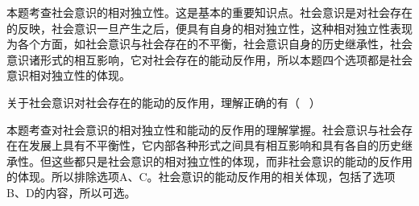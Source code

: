 \begin{solution}本题考查社会意识的相对独立性。这是基本的重要知识点。社会意识是对社会存在的反映，社会意识一旦产生之后，便具有自身的相对独立性，这种相对独立性表现为各个方面，如社会意识与社会存在的不平衡，社会意识自身的历史继承性，社会意识诸形式的相互影响，它对社会存在的能动反作用，所以本题四个选项都是社会意识相对独立性的体现。
\end{solution}
\question 关于社会意识对社会存在的能动的反作用，理解正确的有（ ~）
\par{}
\begin{solution}本题考查对社会意识的相对独立性和能动的反作用的理解掌握。社会意识与社会存在在发展上具有不平衡性，它内部各种形式之间具有相互影响和具有各自的历史继承性。但这些都只是社会意识的相对独立性的体现，而非社会意识的能动的反作用的体现。所以排除选项A、C。社会意识的能动反作用的相关体现，包括了选项B、D的内容，所以可选。
\end{solution}
